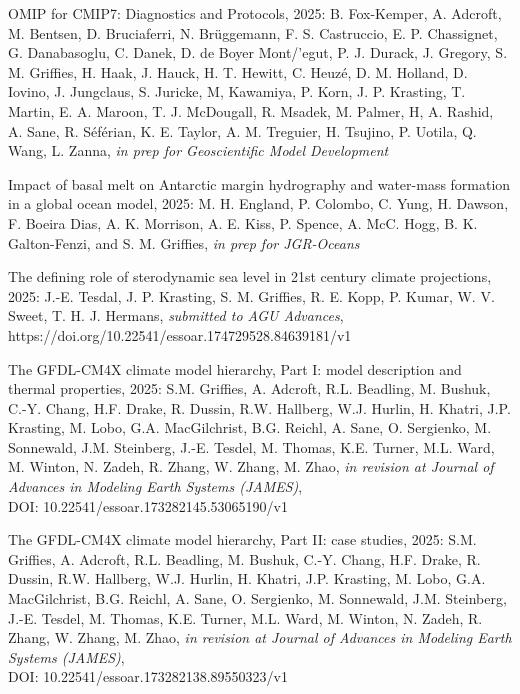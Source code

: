 \begin{etaremune}
\item OMIP for CMIP7: Diagnostics and Protocols, 2025: B. Fox-Kemper, A. Adcroft, M. Bentsen, D. Bruciaferri, N. {Br\"{u}ggemann, F. S. Castruccio, E. P. Chassignet, G. Danabasoglu, C. Danek, D. de Boyer {Mont/'{e}gut}, P. J. Durack, J. Gregory, S. M. Grif\/f\/ies, H. Haak, J. Hauck, H. T. Hewitt, C. Heuz\'{e}}, D. M. Holland, D. Iovino, J. Jungclaus, S. Juricke, M, Kawamiya, P. Korn, J. P. Krasting,  T. Martin, E. A. Maroon, T. J. McDougall, R. Msadek, M. Palmer, H, A. Rashid, A. Sane, R. {S\'{e}f\'{e}rian}, K. E. Taylor, A. M. Treguier, H. Tsujino, P. Uotila, Q. Wang, L. Zanna, {\it in prep for Geoscientific Model Development}

\item Impact of basal melt on Antarctic margin hydrography and water-mass formation in a global ocean model, 2025: M. H. England, P. Colombo,  C. Yung, H. Dawson, F. Boeira Dias, A. K. Morrison, A. E. Kiss, P. Spence, A. McC. Hogg, B. K. Galton-Fenzi, and S. M. Grif\/f\/ies, {\it in prep for JGR-Oceans}

\item The defining role of sterodynamic sea level in 21st century climate projections, 2025: J.-E. Tesdal, J. P. Krasting, S. M. Griffies, R. E. Kopp, P.  Kumar,  W. V. Sweet, T. H. J. Hermans, {\it submitted to AGU Advances}, https://doi.org/10.22541/essoar.174729528.84639181/v1

\item The GFDL-CM4X climate model hierarchy, Part I: model description and thermal properties, 2025: 
S.M. Grif\/f\/ies, A. Adcroft, R.L. Beadling, M. Bushuk, C.-Y. Chang, H.F. Drake, R. Dussin, R.W. Hallberg, W.J. Hurlin, H. Khatri, J.P. Krasting, M. Lobo, G.A. MacGilchrist, B.G. Reichl, A. Sane, O. Sergienko, M. Sonnewald,  J.M. Steinberg, J.-E. Tesdel, M. Thomas, K.E. Turner, M.L. Ward, M. Winton, N. Zadeh, R. Zhang, W. Zhang, M. Zhao, {\it in revision at Journal of Advances in Modeling Earth Systems (JAMES)}, \\
DOI: 10.22541/essoar.173282145.53065190/v1

\item The GFDL-CM4X climate model hierarchy, Part II: case studies, 2025: S.M. Grif\/f\/ies, A. Adcroft,  R.L. Beadling, M. Bushuk, C.-Y. Chang, H.F. Drake, R. Dussin, R.W. Hallberg, W.J. Hurlin, H. Khatri, J.P. Krasting, M. Lobo, G.A. MacGilchrist, B.G. Reichl, A. Sane, O. Sergienko, M. Sonnewald,  J.M. Steinberg, J.-E. Tesdel, M. Thomas, K.E. Turner, M.L. Ward, M. Winton, N. Zadeh, R. Zhang, W. Zhang, M. Zhao, {\it in revision at Journal of Advances in Modeling Earth Systems (JAMES)}, 
\\
DOI: 10.22541/essoar.173282138.89550323/v1


\end{etaremune}



